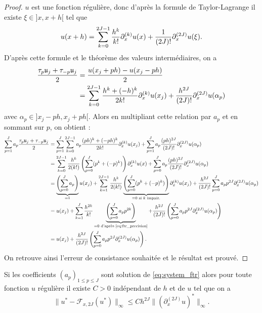 \begin{proof}
$u$ est une fonction régulière, donc d'après la formule de Taylor-Lagrange il existe $\xi \in ]x,x+h[$ tel que
\begin{equation}
u(x+h) = \displaystyle\sum\limits_{k=0}^{2J-1} \dfrac{h^k}{k!} \partial_x^{(k)} u(x) +\dfrac{1}{(2J)!} \partial_x^{(2J)}u(\xi).
\end{equation}
D'après cette formule et le théorème des valeurs intermédiaires, on a
\begin{align*}
\dfrac{\tau_p \mathfrak{u}_j + \tau_{-p} \mathfrak{u}_j}{2} & = \dfrac{u(x_j + ph) - u(x_j-ph)}{2} \\
& = \displaystyle\sum\limits_{k=0}^{2J-1} \dfrac{h^k + (-h)^k}{2k!} \partial_x^{(k)}u(x_j) + \dfrac{h^{2J}}{(2J)!} \partial_x^{(2J)} u(\alpha_p)
\end{align*}
avec $\alpha_p \in ]x_j - ph, x_j + ph[$. Alors en multipliant cette relation par $a_p$ et en sommant sur $p$, on obtient :
\begin{align*}
\displaystyle\sum\limits_{p=1}^J a_p \dfrac{\tau_p \mathfrak{u}_j + \tau_{-p} \mathfrak{u}_j}{2} & = \displaystyle\sum\limits_{p=1}^J \displaystyle\sum\limits_{k=0}^{2J-1} a_p \dfrac{(ph)^k + (-ph)^k}{2k!} \partial_x^{(k)}u(x_j) + \displaystyle\sum\limits_{p=1}^J a_p \dfrac{(ph)^{2J}}{(2J)!} \partial_x^{(2J)}u(\alpha_p) \\
& = \displaystyle\sum\limits_{k=0}^{2J-1} \dfrac{h^k}{2 (k!)} \left( \displaystyle\sum\limits_{p=0}^J (p^k + (-p)^k) \right) \partial_x^{(k)} u(x) + \displaystyle\sum\limits_{p=0}^J a_p \dfrac{(ph)^{2J}}{(2J)!} \partial_x^{(2J)}u(\alpha_p) \\
& = \underbrace{ \left( \displaystyle\sum\limits_{p=0}^J a_p \right)}_{=1}u(x_j) + 
\displaystyle\sum\limits_{k=1}^{2J-1} \dfrac{h^k}{2(k!)} \underbrace{\left( \displaystyle\sum\limits_{p=0}^J (p^k + (-p)^k)  \right)}_{=0 \text{ si } k \text{ impair.}} \partial_x^{(k)}u(x_j) + \dfrac{h^{2J}}{(2J)!} \displaystyle\sum\limits_{p=0}^Ja_p p^{2J} \partial_x^{(2J)}u(\alpha_p)  \\
& = u(x_j) + \displaystyle\sum\limits_{k=1}^J \dfrac{h^{2k}}{k!} \underbrace{\left( \displaystyle\sum\limits_{p=0}^J a_p p^{2k} \right)}_{ = 0 \text{ d'après \eqref{eq:ftr_precision}}}
+ \dfrac{h^{2J}}{(2J)!} \left( \displaystyle\sum\limits_{p=0}^J a_p p^{2J} \partial_x^{(2J)}u(\alpha_p) \right) \\
& = u(x_j) + \dfrac{h^{2J}}{(2J)!} \left( \displaystyle\sum\limits_{p=0}^J a_p p^{2J} \partial_x^{(2J)}u(\alpha_p) \right).
\end{align*}
On retrouve ainsi l'erreur de consistance souhaitée et le résultat est prouvé.
\end{proof}

\begin{corollaire}
Si les coefficients $(a_p)_{1 \leq p \leq J}$ sont solution de \eqref{eq:system_ftr} alors pour toute fonction $u$ régulière il existe $C>0$ indépendant de $h$ et de $u$ tel que  on a 
\begin{equation}
\| u^* -  \mathcal{F}_{x,2J}(u^*) \|_{\infty} \leq C h^{2J} \| (\partial_x^{(2J)}u)^* \|_{\infty}.
\end{equation}
\end{corollaire}


